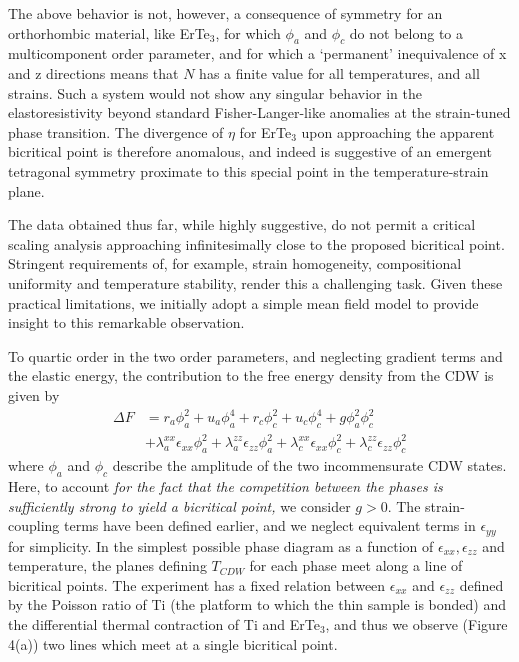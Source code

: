 \documentclass[%
 reprint, %
amsmath,amssymb,
aps,
]{revtex4-2}
\begin{document}
The above behavior is not, however, a consequence of symmetry for an orthorhombic material, like ErTe$_3$, for which $\phi_a$ and $\phi_c$ do not belong to a multicomponent order parameter, and for which a ‘permanent’ inequivalence of x and z directions means that $N$ has a finite value for all temperatures, and all strains. Such a system would not show any singular behavior in the elastoresistivity beyond standard Fisher-Langer-like anomalies at the strain-tuned phase transition.\cite{Hristov2019} The divergence of $\eta$ for ErTe$_3$ upon approaching the apparent bicritical point is therefore anomalous, and indeed is suggestive of an emergent tetragonal symmetry proximate to this special point in the temperature-strain plane.   

The data obtained thus far, while highly suggestive, do not permit a critical scaling analysis approaching infinitesimally close to the proposed bicritical point. Stringent requirements of, for example, strain homogeneity, compositional uniformity and temperature stability, render this a challenging task. Given these practical limitations, we initially adopt a simple mean field model to provide insight to this remarkable observation. 

To quartic order in the two order parameters, and neglecting gradient terms and the elastic energy, the contribution to the free energy density from the CDW is given by
%
\begin{equation} \label{eq1}
\begin{split}
\Delta F & = r_a\phi_a^2 + u_a\phi_a^4 + r_c\phi_c^2 + u_c\phi_c^4 + g\phi_a^2\phi_c^2 \\
& + \lambda_a^{xx}\epsilon_{xx}\phi_a^2+\lambda_a^{zz}\epsilon_{zz}\phi_a^2+ \lambda_c^{xx}\epsilon_{xx}\phi_c^2 + \lambda_c^{zz}\epsilon_{zz}\phi_c^2 
\end{split}
\end{equation}
%
where $\phi_a$ and $\phi_c$ describe the amplitude of the two incommensurate CDW states. Here, to account {\it for the fact that the competition between the phases is sufficiently strong to yield a bicritical point, } we consider $g > 0$. The strain-coupling terms have been defined earlier, and we neglect equivalent terms in $\epsilon_{yy}$ for simplicity. In the simplest possible phase diagram as a function of $\epsilon_{xx}, \epsilon_{zz}$ and temperature, the planes defining $T_{CDW}$ for each phase meet along a line of bicritical points.\cite{Pandey2023} The experiment has a fixed relation between $\epsilon_{xx}$ and $\epsilon_{zz}$ defined by the Poisson ratio of Ti (the platform to which the thin sample is bonded) and the differential thermal contraction of Ti and ErTe$_3$, and thus we observe (Figure 4(a)) two lines which meet at a single bicritical point. 
 
\end{document}
